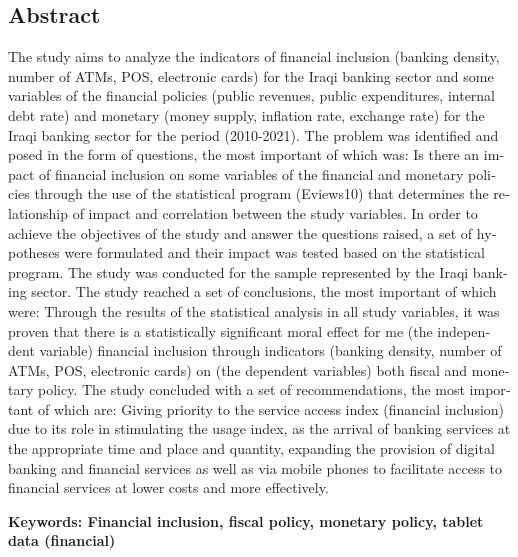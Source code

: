 \documentclass[10pt,a4paper]{report}
\newcommand{\myspace}{\hspace*{1cm}}
\begin{document}
\begin{doublespace}
\section*{\centering \textenglish{Abstract}}
\thispagestyle{plain}
\begin{english}
	\myspace The study aims to analyze the indicators of financial inclusion (banking density, number of ATMs, POS, electronic cards) for the Iraqi banking sector and some variables of the financial policies (public revenues, public expenditures, internal debt rate) and monetary (money supply, inflation rate, exchange rate) for the Iraqi banking sector for the period (2010-2021). The problem was identified and posed in the form of questions, the most important of which was: Is there an impact of financial inclusion on some variables of the financial and monetary policies through the use of the statistical program (Eviews10) that determines the relationship of impact and correlation between the study variables. In order to achieve the objectives of the study and answer the questions raised, a set of hypotheses were formulated and their impact was tested based on the statistical program. The study was conducted for the sample represented by the Iraqi banking sector. The study reached a set of conclusions, the most important of which were: Through the results of the statistical analysis in all study variables, it was proven that there is a statistically significant moral effect for me (the independent variable) financial inclusion through indicators (banking density, number of ATMs, POS, electronic cards) on (the dependent variables) both fiscal and monetary policy. The study concluded with a set of recommendations, the most important of which are: Giving priority to the service access index (financial inclusion) due to its role in stimulating the usage index, as the arrival of banking services at the appropriate time and place and quantity, expanding the provision of digital banking and financial services as well as via mobile phones to facilitate access to financial services at lower costs and more effectively.
	
	\bigskip
	\bigskip
	
	\textbf{Keywords: Financial inclusion, fiscal policy, monetary policy, tablet data (financial)}
\end{english}
\end{doublespace}
\end{document}
